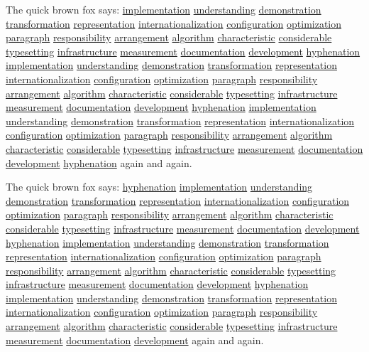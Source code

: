 \documentclass{article}
\begin{document}
The quick brown fox says: \underline{implementation} \underline{understanding} \underline{demonstration} \underline{transformation} \underline{representation} \underline{internationalization} \underline{configuration} \underline{optimization} \underline{paragraph} \underline{responsibility} \underline{arrangement} \underline{algorithm} \underline{characteristic} \underline{considerable} \underline{typesetting} \underline{infrastructure} \underline{measurement} \underline{documentation} \underline{development} \underline{hyphenation} \underline{implementation} \underline{understanding} \underline{demonstration} \underline{transformation} \underline{representation} \underline{internationalization} \underline{configuration} \underline{optimization} \underline{paragraph} \underline{responsibility} \underline{arrangement} \underline{algorithm} \underline{characteristic} \underline{considerable} \underline{typesetting} \underline{infrastructure} \underline{measurement} \underline{documentation} \underline{development} \underline{hyphenation} \underline{implementation} \underline{understanding} \underline{demonstration} \underline{transformation} \underline{representation} \underline{internationalization} \underline{configuration} \underline{optimization} \underline{paragraph} \underline{responsibility} \underline{arrangement} \underline{algorithm} \underline{characteristic} \underline{considerable} \underline{typesetting} \underline{infrastructure} \underline{measurement} \underline{documentation} \underline{development} \underline{hyphenation} again and again.

The quick brown fox says: \underline{hyphenation} \underline{implementation} \underline{understanding} \underline{demonstration} \underline{transformation} \underline{representation} \underline{internationalization} \underline{configuration} \underline{optimization} \underline{paragraph} \underline{responsibility} \underline{arrangement} \underline{algorithm} \underline{characteristic} \underline{considerable} \underline{typesetting} \underline{infrastructure} \underline{measurement} \underline{documentation} \underline{development} \underline{hyphenation} \underline{implementation} \underline{understanding} \underline{demonstration} \underline{transformation} \underline{representation} \underline{internationalization} \underline{configuration} \underline{optimization} \underline{paragraph} \underline{responsibility} \underline{arrangement} \underline{algorithm} \underline{characteristic} \underline{considerable} \underline{typesetting} \underline{infrastructure} \underline{measurement} \underline{documentation} \underline{development} \underline{hyphenation} \underline{implementation} \underline{understanding} \underline{demonstration} \underline{transformation} \underline{representation} \underline{internationalization} \underline{configuration} \underline{optimization} \underline{paragraph} \underline{responsibility} \underline{arrangement} \underline{algorithm} \underline{characteristic} \underline{considerable} \underline{typesetting} \underline{infrastructure} \underline{measurement} \underline{documentation} \underline{development} again and again.
\end{document}

